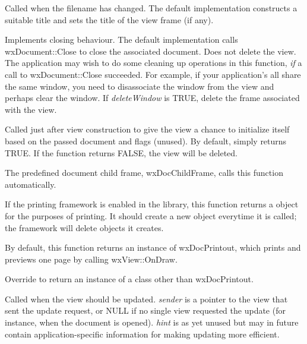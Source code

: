 

Called when the filename has changed. The default implementation constructs a
suitable title and sets the title of the view frame (if any).



Implements closing behaviour. The default implementation calls wxDocument::Close
to close the associated document. Does not delete the view. The application
may wish to do some cleaning up operations in this function, {\it if} a
call to wxDocument::Close succeeded. For example, if your application's
all share the same window, you need to disassociate the window from the view
and perhaps clear the window. If {\it deleteWindow} is TRUE, delete the
frame associated with the view.



Called just after view construction to give the view a chance to initialize
itself based on the passed document and flags (unused). By default, simply
returns TRUE. If the function returns FALSE, the view will be deleted.

The predefined document child frame, wxDocChildFrame, calls this function
automatically.



If the printing framework is enabled in the library, this function returns a
\rtfsp{} object for the purposes of printing. It should create a new object
everytime it is called; the framework will delete objects it creates.

By default, this function returns an instance of wxDocPrintout, which prints
and previews one page by calling wxView::OnDraw.

Override to return an instance of a class other than wxDocPrintout.



Called when the view should be updated. {\it sender} is a pointer to the view
that sent the update request, or NULL if no single view requested the update (for instance,
when the document is opened). {\it hint} is as yet unused but may in future contain
application-specific information for making updating more efficient.

